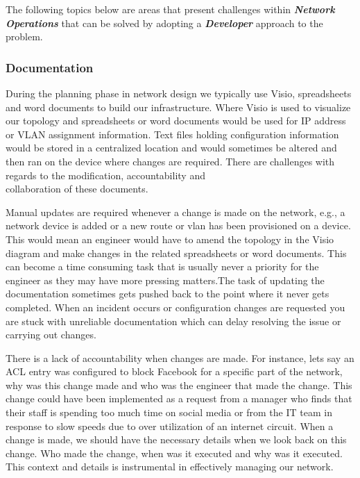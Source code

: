 \documentclass[12pt, letterpaper]{article}
\begin{document}
\medskip

The following topics below are areas that present challenges within \textbf{\textit{Network Operations}} that can be solved by adopting a \textbf{\textit{Developer}} approach to the problem.

	\subsubsection{Documentation}
During the planning phase in network design we typically use Visio, spreadsheets and word documents to build our infrastructure. Where Visio is used to visualize our topology and spreadsheets or word documents would be used for IP address or VLAN assignment information. Text files holding configuration information would be stored in a centralized location and would sometimes be altered and then ran on the device where changes are required. There are challenges with regards to the modification, accountability and \\ collaboration of these documents.

\medskip

Manual updates are required whenever a change is made on the network, e.g., a network device is added or a new route or vlan has been provisioned on a device. This would mean an engineer would have to amend the topology in the Visio diagram and make changes in the related spreadsheets or word documents. This can become a time consuming task that is usually never a priority for the engineer as they may have more pressing matters.The task of updating the documentation sometimes gets pushed back to the point where it never gets completed. When an incident occurs or configuration changes are requested you are stuck with unreliable documentation which can delay resolving the issue or \\ 
carrying out changes.

\medskip

There is a lack of accountability when changes are made. For instance, lets say an ACL entry was configured to block Facebook for a specific part of the network, why was this change made and who was the engineer that made the change. This change could have been implemented as a request from a manager who finds that their staff is spending too much time on social media or from the IT team in response to slow speeds due to over utilization of an internet circuit.
When a change is made, we should have the necessary details when we look back on this change. Who made the change, when was it executed and why was it executed. This context and details is instrumental in effectively managing our network.
\end{document}
